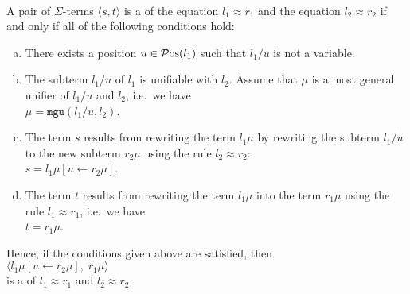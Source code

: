 \begin{Definition} \hspace*{\fill} \\
  A pair of $\Sigma$-terms $\langle s, t\rangle$ is a  of the equation $l_1 \approx r_1$ and
  the equation $l_2 \approx r_2$ if and only if all of the following conditions hold:
  \begin{enumerate}[(a)]
  \item There exists a position $u \in \mathcal{P}\mathrm{os}(l_1)$ such that $l_1/u$ is not a variable.
  \item The subterm $l_1/u$ of $l_1$ is unifiable with $l_2$.  Assume that $\mu$ is a most general unifier
        of $l_1/u$ and $l_2$, i.e.~we have
        \\[0.2cm]
        \hspace*{1.3cm}
        $\mu = \texttt{mgu}(l_1/u, l_2)$.
  \item The term $s$ results from rewriting the term $l_1\mu$ by rewriting the subterm $l_1/u$
        to the new subterm $r_2\mu$ using the rule $l_2 \approx r_2$:      
        \\[0.2cm]
        \hspace*{1.3cm}
        $s = l_1\mu[u \leftarrow r_2\mu]$.
  \item The term $t$ results from rewriting the term $l_1\mu$ into the term $r_1\mu$ using the rule
        $l_1 \approx r_1$, i.e.~we have
        \\[0.2cm]
        \hspace*{1.3cm}
        $t = r_1\mu$.  
      \end{enumerate}
      Hence, if the conditions given above are satisfied, then
      \\[0.2cm]
      \hspace*{1.3cm}
      $\bigl\langle l_1\mu[u \leftarrow r_2\mu],\; r_1\mu \bigr\rangle$
      \\[0.2cm]
      is a  of $l_1 \approx r_1$ and $l_2 \approx r_2$. \eod
\end{Definition}

